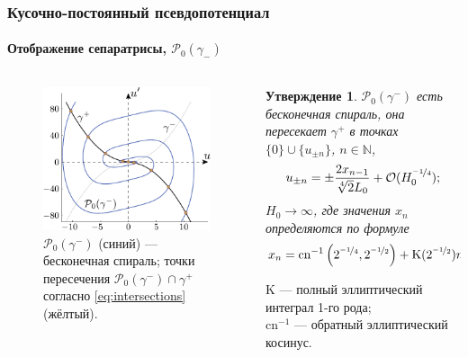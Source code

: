 \documentclass [10pt] {beamer}
\newtheorem{proposition}{Утверждение}
\begin{document}
\begin{frame}
	\frametitle{Кусочно-постоянный псевдопотенциал}
	\framesubtitle{Отображение сепаратрисы, $\mathcal{P}_0(\gamma_-)$}
	
	\begin{columns}[T]
		\begin{column}{.5\textwidth}
			\begin{figure}
			\includegraphics[width = 1\textwidth]{pic/separatrix map with numerical computations.pdf}
			\caption{$\mathcal{P}_0(\gamma^-)$ (синий) --- бесконечная спираль; точки пересечения $\mathcal{P}_0(\gamma^-) \cap \gamma^+$ согласно \eqref{eq:intersections} (жёлтый).}
			\end{figure}
		\end{column}
		\begin{column}{.5\textwidth}
			\begin{proposition}
				$\mathcal{P}_0 (\gamma^-)$ есть бесконечная спираль, она пересекает $\gamma^+$ в точках $\{0\} \cup \{u_{\pm n}\}$, $n \in \mathbb{N}$,
				\begin{equation}
					u_{\pm n} = \pm \dfrac{2 x_{n - 1}}{\sqrt[4]{2} L_0} + \mathcal{O}(H_0^{\nicefrac{-1}{4}});
					\label{eq:intersections}
				\end{equation}
				$H_0 \to \infty$, где значения $x_n$ определяются по формуле
				\begin{equation*}
					x_n = \mathrm{cn}^{-1} \left( 2^{\nicefrac{-1}{4}}, 2^{\nicefrac{-1}{2}} \right) + \mathrm{K}(2^{\nicefrac{-1}{2}}) n.
				\end{equation*}
			\end{proposition}
			
			$\textrm{K}$ --- полный эллиптический интеграл 1-го рода; \\
			$\textrm{cn}^{-1}$ --- обратный эллиптический косинус.
		\end{column}
	\end{columns}
\end{frame}
\end{document}
